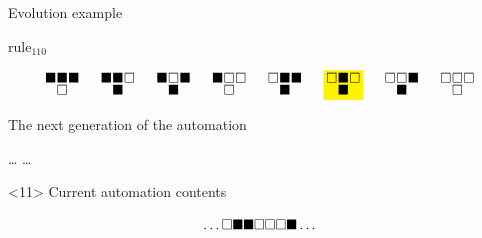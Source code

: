 \documentclass[presentation,aspectratio=169,smaller]{beamer}
\begin{document}
\begin{frame}[label={sec:org812e2ea},t]{Evolution example}
\begin{onlyenv}
\(\text{rule}_{110}\)

\begin{equation*}
  \begingroup
  \setlength\arraycolsep{0.25pt}
  \renewcommand{\arraystretch}{0.5}
  \begin{matrix}
    \blacksquare & \blacksquare & \blacksquare \\
    & \square &
  \end{matrix}\mspace{28mu}
  \begin{matrix}
    \blacksquare & \blacksquare & \square \\
    & \blacksquare &
  \end{matrix}\mspace{28mu}
  \begin{matrix}
    \blacksquare & \square & \blacksquare \\
    & \blacksquare &
  \end{matrix}\mspace{28mu}
  \begin{matrix}
    \blacksquare & \square & \square \\
    & \square &
  \end{matrix}\mspace{28mu}
  \begin{matrix}
    \square & \blacksquare & \blacksquare \\
    & \blacksquare &
  \end{matrix}\mspace{28mu}
  \mathcolorbox{yellow}{
    \begin{matrix}
      \square & \blacksquare & \square \\
      & \blacksquare &
    \end{matrix}
  }\mspace{28mu}
  \begin{matrix}
    \square & \square & \blacksquare \\
    & \blacksquare &
  \end{matrix}\mspace{28mu}
  \begin{matrix}
    \square & \square & \square \\
    & \square &
  \end{matrix}
  \endgroup
\end{equation*}

The next generation of the automation

\hfill \dots
\blacksquare
\blacksquare
\blacksquare
\square
\square
\square
{}
\dots \hfill
\end{onlyenv}

\begin{onlyenv}<11>
Current automation contents

\begin{equation*}
  \hfill
  \dots
  \square
  \blacksquare
  \blacksquare
  \square
  \square
  \square
  \blacksquare
  \dots
  \hfill
\end{equation*}


\end{onlyenv}
\end{frame}
\end{document}
